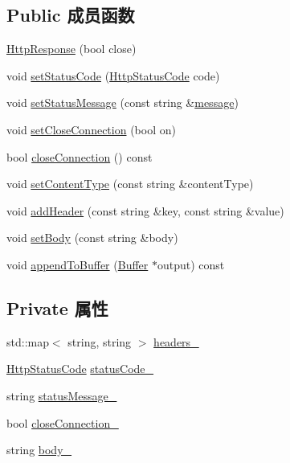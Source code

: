 \subsection*{Public 成员函数}
\begin{DoxyCompactItemize}
\item 
\hyperlink{classmuduo_1_1net_1_1HttpResponse_ad347f66c2e5e163d88120c59e56dd27f}{Http\+Response} (bool close)
\item 
void \hyperlink{classmuduo_1_1net_1_1HttpResponse_ad1aabf915b59756bb018249928221787}{set\+Status\+Code} (\hyperlink{classmuduo_1_1net_1_1HttpResponse_ab80f66127508dfced7a0fe1929fe12cc}{Http\+Status\+Code} code)
\item 
void \hyperlink{classmuduo_1_1net_1_1HttpResponse_abb542ea3323fddfbcc172c75fe4e6015}{set\+Status\+Message} (const string \&\hyperlink{test13_8cc_a36bd74109f547f7f8198faf5a12d2879}{message})
\item 
void \hyperlink{classmuduo_1_1net_1_1HttpResponse_a8edbcd81fcbbafb46b9d95f56d2a6567}{set\+Close\+Connection} (bool on)
\item 
bool \hyperlink{classmuduo_1_1net_1_1HttpResponse_ab8fae68a967e14c3eb49839bb7e37e8c}{close\+Connection} () const
\item 
void \hyperlink{classmuduo_1_1net_1_1HttpResponse_a1d3cf167b4c287497e4c38c78a0f1809}{set\+Content\+Type} (const string \&content\+Type)
\item 
void \hyperlink{classmuduo_1_1net_1_1HttpResponse_a999431a881eda9ce08a1077445f0da57}{add\+Header} (const string \&key, const string \&value)
\item 
void \hyperlink{classmuduo_1_1net_1_1HttpResponse_a8c51abf32832a62b037331cfa6d762cb}{set\+Body} (const string \&body)
\item 
void \hyperlink{classmuduo_1_1net_1_1HttpResponse_ad653b5453eec08dd28444d57bfc2b94b}{append\+To\+Buffer} (\hyperlink{classmuduo_1_1net_1_1Buffer}{Buffer} $\ast$output) const
\end{DoxyCompactItemize}
\subsection*{Private 属性}
\begin{DoxyCompactItemize}
\item 
std\+::map$<$ string, string $>$ \hyperlink{classmuduo_1_1net_1_1HttpResponse_a5399fcc713a2d468facbbcc1e84999cf}{headers\+\_\+}
\item 
\hyperlink{classmuduo_1_1net_1_1HttpResponse_ab80f66127508dfced7a0fe1929fe12cc}{Http\+Status\+Code} \hyperlink{classmuduo_1_1net_1_1HttpResponse_a24a07a498fb950d72850091c0306c939}{status\+Code\+\_\+}
\item 
string \hyperlink{classmuduo_1_1net_1_1HttpResponse_a2f9afda0b0e65abfe8f2525de3db81b1}{status\+Message\+\_\+}
\item 
bool \hyperlink{classmuduo_1_1net_1_1HttpResponse_a18563cbdd30986ec38ffaac652078389}{close\+Connection\+\_\+}
\item 
string \hyperlink{classmuduo_1_1net_1_1HttpResponse_a72879b508873c81ba40a4919bc67ab7f}{body\+\_\+}
\end{DoxyCompactItemize}
